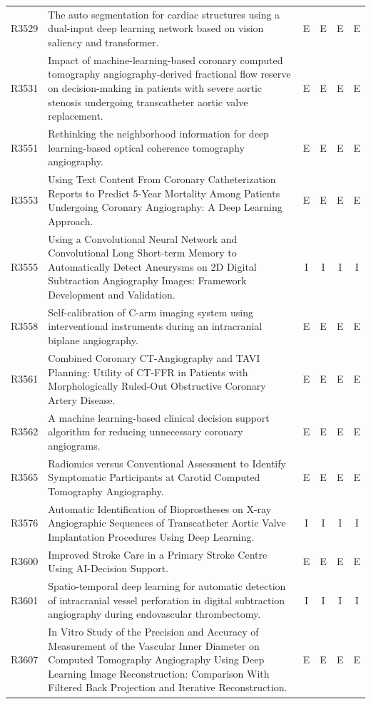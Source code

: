 \begin{longtable}{@{}l p{8.6cm} c c c c@{}}
R3529 & The auto segmentation for cardiac structures using a dual-input deep learning network based on vision saliency and transformer. & E & E & E & E \\
R3531 & Impact of machine-learning-based coronary computed tomography angiography-derived fractional flow reserve on decision-making in patients with severe aortic stenosis undergoing transcatheter aortic valve replacement. & E & E & E & E \\
R3551 & Rethinking the neighborhood information for deep learning-based optical coherence tomography angiography. & E & E & E & E \\
R3553 & Using Text Content From Coronary Catheterization Reports to Predict 5-Year Mortality Among Patients Undergoing Coronary Angiography: A Deep Learning Approach. & E & E & E & E \\
R3555 & Using a Convolutional Neural Network and Convolutional Long Short-term Memory to Automatically Detect Aneurysms on 2D Digital Subtraction Angiography Images: Framework Development and Validation. & I & I & I & I \\
R3558 & Self-calibration of C-arm imaging system using interventional instruments during an intracranial biplane angiography. & E & E & E & E \\
R3561 & Combined Coronary CT-Angiography and TAVI Planning: Utility of CT-FFR in Patients with Morphologically Ruled-Out Obstructive Coronary Artery Disease. & E & E & E & E \\
R3562 & A machine learning-based clinical decision support algorithm for reducing unnecessary coronary angiograms. & E & E & E & E \\
R3565 & Radiomics versus Conventional Assessment to Identify Symptomatic Participants at Carotid Computed Tomography Angiography. & E & E & E & E \\
R3576 & Automatic Identification of Bioprostheses on X-ray Angiographic Sequences of Transcatheter Aortic Valve Implantation Procedures Using Deep Learning. & I & I & I & I \\
R3600 & Improved Stroke Care in a Primary Stroke Centre Using AI-Decision Support. & E & E & E & E \\
R3601 & Spatio-temporal deep learning for automatic detection of intracranial vessel perforation in digital subtraction angiography during endovascular thrombectomy. & I & I & I & I \\
R3607 & In Vitro Study of the Precision and Accuracy of Measurement of the Vascular Inner Diameter on Computed Tomography Angiography Using Deep Learning Image Reconstruction: Comparison With Filtered Back Projection and Iterative Reconstruction. & E & E & E & E \\

\end{longtable}
